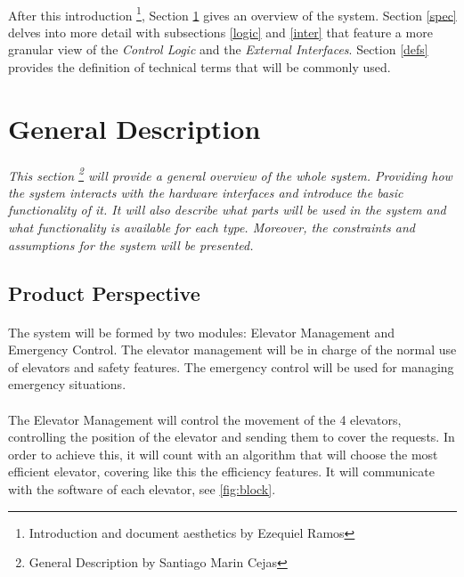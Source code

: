 \documentclass[12pt]{article}
\begin{document}
	 \paragraph{} After this introduction \footnote{Introduction and document aesthetics by Ezequiel Ramos}, 
	 Section \ref{gen} gives an overview of the system. Section \ref{spec} delves into more 
	 detail with subsections \ref{logic} and \ref{inter} that feature a more granular view 
	 of the \textit{Control Logic} and the \textit{External Interfaces}. Section \ref{defs} 
	 provides the definition of technical terms that will be commonly used.
\pagebreak
\section{General Description} \label{gen} %
	\paragraph{}\textit{This section \footnote{General Description by Santiago Marin Cejas} will provide a general overview of the whole system. 
	Providing how the system interacts with the hardware interfaces and introduce the 
	basic functionality of it. It will also describe what parts will be used in the system 
	and what functionality is available for each type. Moreover, the constraints and 
	assumptions for the system will be presented.}
	
	\subsection{Product Perspective}
		\paragraph{} The system will be formed by two modules: Elevator Management and 
		Emergency Control. The elevator management will be in charge of the normal use 
		of elevators and safety features. The emergency control will be used for managing 
		emergency situations.

		\paragraph{} The Elevator Management will control the movement of the 4 elevators, 
		controlling the position of the elevator and sending them to cover the requests. 
		In order to achieve this, it will count with an algorithm that will choose the most 
		efficient elevator, covering like this the efficiency features. It will communicate 
		with the software of each elevator, see \ref{fig:block}.
		
\end{document}
